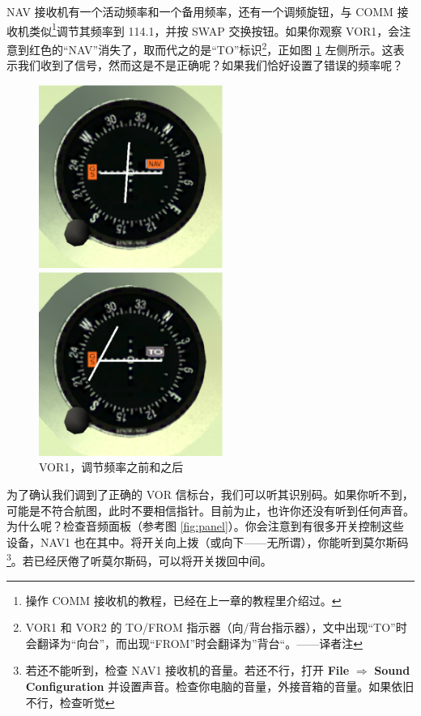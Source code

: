 NAV 接收机有一个活动频率和一个备用频率，还有一个调频旋钮，与 COMM 接收机类似\footnote{操作 COMM 接收机的教程，已经在上一章的教程里介绍过。}调节其频率到 114.1，并按 SWAP 交换按钮。如果你观察 VOR1，会注意到红色的“NAV”消失了，取而代之的是“TO”标识\footnote{VOR1 和 VOR2 的 TO/FROM 指示器（向/背台指示器），文中出现“TO”时会翻译为“向台”，而出现“FROM”时会翻译为”背台“。——译者注}，正如图 \ref{fig:VOR1} 左侧所示。这表示我们收到了信号，然而这是不是正确呢？如果我们恰好设置了错误的频率呢？

\begin{figure}
  \begin{minipage}[b]{0.5\linewidth}
    \includegraphics[width=6cm]{img/VOR1_before}
  \end{minipage}
  \hspace{0.5cm}
  \begin{minipage}[b]{0.5\linewidth}
    \includegraphics[width=6cm]{img/VOR1_after}
  \end{minipage}
  \caption{VOR1，调节频率之前和之后}
  \label{fig:VOR1}
\end{figure}

为了确认我们调到了正确的 VOR 信标台，我们可以听其识别码。如果你听不到，可能是不符合航图，此时不要相信指针。目前为止，也许你还没有听到任何声音。为什么呢？检查音频面板（参考图 \ref{fig:panel}）。你会注意到有很多开关控制这些设备，NAV1 也在其中。将开关向上拨（或向下——无所谓），你能听到莫尔斯码 \mdot\mdot\mdot\mspace
\mdot\mdash\mdash\mdash\mspace \mdash\mdot\mdash\mdot\footnote{若还不能听到，检查 NAV1 接收机的音量。若还不行，打开 \textbf{\textsf{File}} $\Rightarrow$ \textbf{\textsf{Sound Configuration}} 并设置声音。检查你电脑的音量，外接音箱的音量。如果依旧不行，检查听觉}。若已经厌倦了听莫尔斯码，可以将开关拨回中间。

